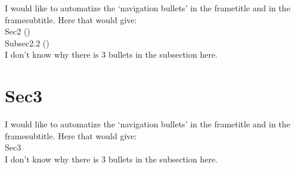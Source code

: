 \documentclass{beamer}
\begin{document}
\begin{frame}
   I would like to automatize the `navigation bullets' in the frametitle and in the framesubtitle. Here that would give:\\[5mm]
   Sec2 (\textbullet\textbullet\textbullet)\\
   Subsec2.2 (\textbullet\textbullet)\\[5mm]

   \color{red}I don't know why there is 3 bullets in the subsection here.
\end{frame}

\section{Sec3}

\begin{frame}
   I would like to automatize the `navigation bullets' in the frametitle and in the framesubtitle. Here that would give:\\[5mm]
   Sec3\\[5mm]

   \color{red}I don't know why there is 3 bullets in the subsection here.
\end{frame}
\end{document}

